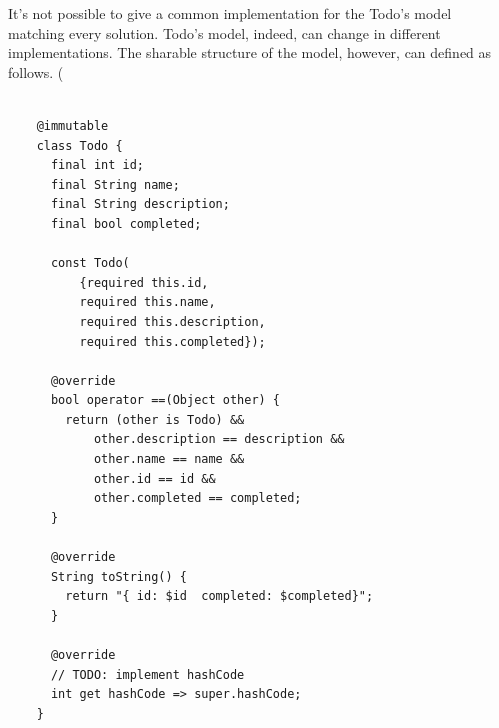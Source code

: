 It's not possible to give a common implementation for the Todo's model matching every solution. Todo's model, indeed, can change in different implementations. The sharable structure of the model, however, can defined as follows. (
	\mbox{}\\
	\begin{code}
	
\label{code:2.4}
	\begin{verbatim}
	
	@immutable
	class Todo {
	  final int id;
	  final String name;
	  final String description;
	  final bool completed;
	
	  const Todo(
	      {required this.id,
	      required this.name,
	      required this.description,
	      required this.completed});
	
	  @override
	  bool operator ==(Object other) {
	    return (other is Todo) &&
	        other.description == description &&
	        other.name == name &&
	        other.id == id &&
	        other.completed == completed;
	  }
	
	  @override
	  String toString() {
	    return "{ id: $id  completed: $completed}";
	  }
	
	  @override
	  // TODO: implement hashCode
	  int get hashCode => super.hashCode;
	}
	
	\end{verbatim}
	\end{code}
	
